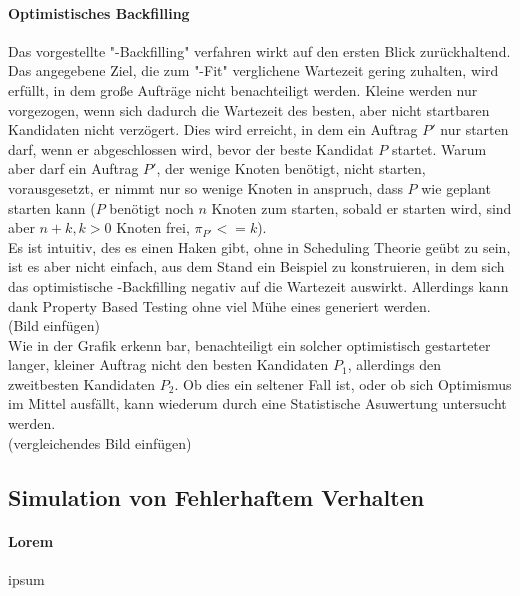 \paragraph{Optimistisches Backfilling}
Das vorgestellte "-Backfilling" verfahren wirkt auf den ersten Blick zurückhaltend. Das angegebene Ziel, die zum "-Fit" verglichene Wartezeit gering zuhalten, wird erfüllt, in dem große Aufträge nicht benachteiligt werden. Kleine werden nur vorgezogen, wenn sich dadurch die Wartezeit des besten, aber nicht startbaren Kandidaten nicht verzögert. Dies wird erreicht, in dem ein Auftrag $P'$ nur starten darf, wenn er abgeschlossen wird, bevor der beste Kandidat $P$ startet. Warum aber darf ein Auftrag $P'$, der wenige Knoten benötigt, nicht starten, vorausgesetzt, er nimmt nur so wenige Knoten in anspruch, dass $P$ wie geplant starten kann ($P$ benötigt noch $n$ Knoten zum starten, sobald er starten wird, sind aber $n+k, k>0$ Knoten frei, $\pi_{P'} <= k$).\\
Es ist intuitiv, des es einen Haken gibt, ohne in Scheduling Theorie geübt zu sein, ist es aber nicht einfach, aus dem Stand ein Beispiel zu konstruieren, in dem sich das optimistische -Backfilling negativ auf die Wartezeit auswirkt. Allerdings kann dank Property Based Testing ohne viel Mühe eines generiert werden.
\\(Bild einfügen)
\\Wie in der Grafik erkenn bar, benachteiligt ein solcher optimistisch gestarteter langer, kleiner Auftrag nicht den besten Kandidaten $P_1$, allerdings den zweitbesten Kandidaten $P_2$. Ob dies ein seltener Fall ist, oder ob sich Optimismus im Mittel ausfällt, kann wiederum durch eine Statistische Asuwertung untersucht werden.
\\(vergleichendes Bild einfügen)

\subsection{Simulation von Fehlerhaftem Verhalten}
\label{simErrors}

\paragraph{Lorem}
ipsum